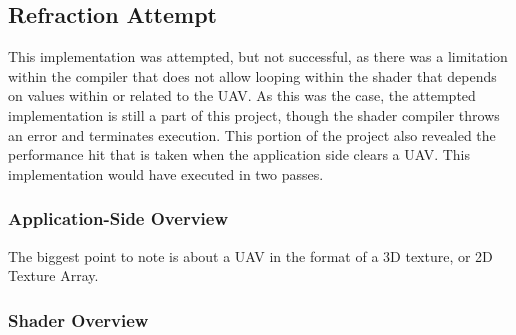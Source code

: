 \documentclass[a4paper, 12pt]{article}
\begin{document}
\subsection{Refraction Attempt}
\label{subsection:RefractionAttemptImplementation}

This implementation was attempted, but not successful, as there was a
limitation within the compiler that does not allow looping within the shader
that depends on values within or related to the UAV. As this was the case, the
attempted implementation is still a part of this project, though the shader
compiler throws an error and terminates execution. This portion of the project
also revealed the performance hit that is taken when the application side
clears a UAV. This implementation would have executed in two passes.


\subsubsection{Application-Side Overview}

The biggest point to note is about a UAV in the format of a 3D texture, or 2D
Texture Array. 

\subsubsection{Shader Overview}
\end{document}
